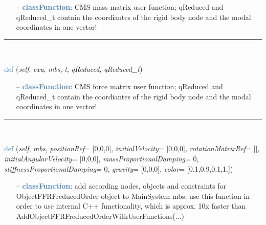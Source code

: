 \begin{itemize}[leftmargin=1.4cm]
\begin{itemize}[leftmargin=1.4cm]
\begin{itemize}[leftmargin=0.5cm]
\begin{itemize}[leftmargin=1.4cm]
\begin{itemize}[leftmargin=1.4cm]
\begin{itemize}[leftmargin=0.5cm]
\setlength{\itemindent}{0.7cm}
\begin{itemize}[leftmargin=0.7cm]
\item[--]\textcolor{steelblue}{\bf classFunction}: CMS mass matrix user function; qReduced and qReduced\_t contain the coordiantes of the rigid body node and the modal coordinates in one vector!
\vspace{12pt}\end{itemize}
%
\noindent\rule{8cm}{0.75pt}\vspace{1pt} \\ 
\begin{flushleft}
\noindent \textcolor{steelblue}{def {\bf {}}}\label{sec:FEM:ObjectFFRFreducedOrderInterface:UFforceFFRFreducedOrder}
({\it self}, {\it exu}, {\it mbs}, {\it t}, {\it qReduced}, {\it qReduced\_t})
\end{flushleft}
\setlength{\itemindent}{0.7cm}
\begin{itemize}[leftmargin=0.7cm]
\item[--]\textcolor{steelblue}{\bf classFunction}: CMS force matrix user function; qReduced and qReduced\_t contain the coordiantes of the rigid body node and the modal coordinates in one vector!
\vspace{12pt}\end{itemize}
%
\noindent\rule{8cm}{0.75pt}\vspace{1pt} \\ 
\begin{flushleft}
\noindent \textcolor{steelblue}{def {\bf {}}}\label{sec:FEM:ObjectFFRFreducedOrderInterface:AddObjectFFRFreducedOrder}
({\it self}, {\it mbs}, {\it positionRef}= [0,0,0], {\it initialVelocity}= [0,0,0], {\it rotationMatrixRef}= [], {\it initialAngularVelocity}= [0,0,0], {\it massProportionalDamping}= 0, {\it stiffnessProportionalDamping}= 0, {\it gravity}= [0,0,0], {\it color}= [0.1,0.9,0.1,1.])
\end{flushleft}
\setlength{\itemindent}{0.7cm}
\begin{itemize}[leftmargin=0.7cm]
\item[--]\textcolor{steelblue}{\bf classFunction}: add according nodes, objects and constraints for ObjectFFRFreducedOrder object to MainSystem mbs; use this function in order to use internal C++ functionality, which is approx. 10x faster than AddObjectFFRFreducedOrderWithUserFunctions(...)

\end{itemize}
\end{itemize}
\end{itemize}
\end{itemize}
\end{itemize}
\end{itemize}
\end{itemize}
